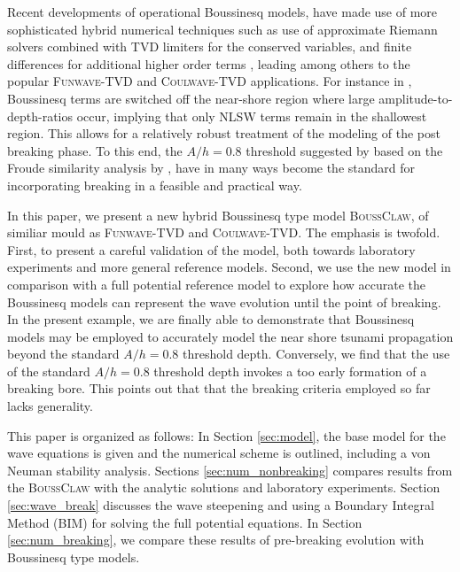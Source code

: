 \documentclass[review]{elsarticle}
\begin{document}
Recent developments of operational Boussinesq models, have made use of more sophisticated hybrid numerical techniques
such as use of approximate Riemann solvers combined with TVD limiters for the conserved variables, and finite differences
for additional higher order terms \citep{Erduran2005,Kim2009,shi2012high}, leading among others to the popular
\textsc{Funwave-TVD} and \textsc{Coulwave-TVD} applications. For instance in \citet{shi2012high}, Boussinesq terms are 
switched off the near-shore region where large amplitude-to-depth-ratios occur,
implying that only NLSW terms remain in the shallowest region.
This allows for a relatively robust treatment of the modeling of the post breaking phase. To this end,
the $A/h = 0.8$ threshold suggested by \citep{shi2012high} 
based on the Froude similarity analysis by \citet{tonelli2009hybrid}, have in many ways become the standard for incorporating
breaking in a feasible and practical way.

In this paper, we present a new hybrid Boussinesq type model \textsc{BoussClaw}, 
of similiar mould as \textsc{Funwave-TVD} and \textsc{Coulwave-TVD}. The emphasis is twofold.
First, to present a careful validation of the model, both towards  
laboratory experiments and more general reference models. Second, we use the new model
in comparison with a full potential reference model to explore how accurate the Boussinesq models 
can represent the wave evolution until the point of breaking. In the present example,
we are finally able to demonstrate that Boussinesq models may be employed
to accurately model the near shore tsunami propagation beyond the standard $A/h = 0.8$ threshold depth.
Conversely, we find that the use of the standard $A/h = 0.8$ threshold depth 
invokes a too early formation of a breaking bore. This points out that  
that the breaking criteria employed so far lacks generality.

This paper is organized as follows: In Section \ref{sec:model}, the base model
for the wave equations is given and the numerical scheme is outlined, including a von Neuman stability analysis. 
Sections \ref{sec:num_nonbreaking} compares results from the \textsc{BoussClaw} with
the analytic solutions and laboratory experiments. 
Section \ref{sec:wave_break} discusses the wave steepening and using a Boundary Integral Method (BIM) for 
solving the full potential equations. 
In Section \ref{sec:num_breaking}, 
we compare these results of pre-breaking
evolution with Boussinesq type models.
\end{document}

